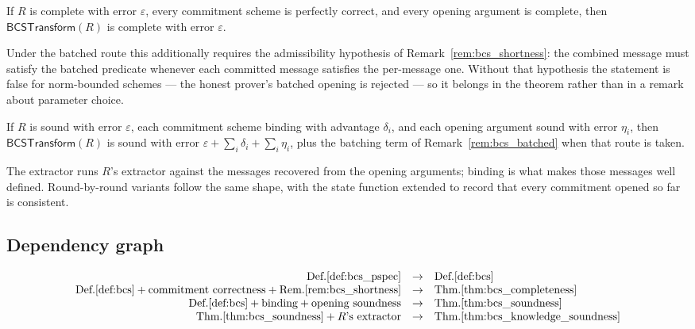 \begin{theorem}[Completeness]
    \label{thm:bcs_completeness}
    If $R$ is complete with error $\varepsilon$, every commitment scheme is perfectly correct, and
    every opening argument is complete, then $\mathsf{BCSTransform}(R)$ is complete with error
    $\varepsilon$.

    Under the batched route this additionally requires the admissibility hypothesis of
    Remark~\ref{rem:bcs_shortness}: the combined message must satisfy the batched predicate
    whenever each committed message satisfies the per-message one. Without that hypothesis the
    statement is false for norm-bounded schemes --- the honest prover's batched opening is
    rejected --- so it belongs in the theorem rather than in a remark about parameter choice.
\end{theorem}

\begin{theorem}[Soundness]
    \label{thm:bcs_soundness}
    If $R$ is sound with error $\varepsilon$, each commitment scheme binding with advantage
    $\delta_i$, and each opening argument sound with error $\eta_i$, then
    $\mathsf{BCSTransform}(R)$ is sound with error $\varepsilon + \sum_i \delta_i + \sum_i \eta_i$,
    plus the batching term of Remark~\ref{rem:bcs_batched} when that route is taken.
\end{theorem}

\begin{theorem}
    \label{thm:bcs_knowledge_soundness}
    The extractor runs $R$'s extractor against the messages recovered from the opening arguments;
    binding is what makes those messages well defined. Round-by-round variants follow the same
    shape, with the state function extended to record that every commitment opened so far is
    consistent.
\end{theorem}

\subsection{Dependency graph}\label{sec:bcs_deps}

\[
\begin{array}{rcl}
\text{Def.\ref{def:bcs_pspec}} &\to& \text{Def.\ref{def:bcs}} \\
\text{Def.\ref{def:bcs}} + \text{commitment correctness}
    + \text{Rem.\ref{rem:bcs_shortness}} &\to& \text{Thm.\ref{thm:bcs_completeness}} \\
\text{Def.\ref{def:bcs}} + \text{binding} + \text{opening soundness} &\to& \text{Thm.\ref{thm:bcs_soundness}} \\
\text{Thm.\ref{thm:bcs_soundness}} + \text{$R$'s extractor} &\to& \text{Thm.\ref{thm:bcs_knowledge_soundness}}
\end{array}
\]

